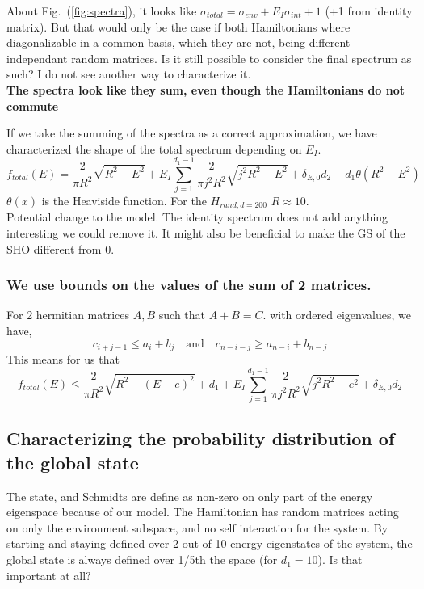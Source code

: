 \documentclass{article}
\begin{document}
About Fig.~(\ref{fig:spectra}), it looks like $\sigma_{total}=\sigma_{env}+E_I\sigma_{int} + 1$ (+1 from identity matrix). But that would only be the case if both Hamiltonians where diagonalizable in a common basis, which they are not, being different independant random matrices. Is it still possible to consider the final spectrum as such? I do not see another way to characterize it.\\

{\color{teal} \textbf{The spectra look like they sum, even though the Hamiltonians do not commute}}

If we take the summing of the spectra as a correct approximation, we have characterized the shape of the total spectrum depending on $E_I$. 
\begin{equation}
    f_{total}(E) = \frac{2}{\pi R^2}\sqrt{R^2-E^2} + E_I\sum_{j=1}^{d_1-1}\frac{2}{\pi j^2R^2}\sqrt{j^2R^2-E^2} + \delta_{E,0}d_2 + d_1\theta(R^2-E^2)
\end{equation}
$\theta(x)$ is the Heaviside function. For the $H_{rand, d=200}$ $R\approx 10$.\\

Potential change to the model. The identity spectrum does not add anything interesting we could remove it. It might also be beneficial to make the GS of the SHO different from 0. 

\subsubsection{We use bounds on the values of the sum of 2 matrices.}

For 2 hermitian matrices $A,B$ such that $A+B=C$. with ordered eigenvalues, we have,
\begin{equation}
    c_{i+j-1}\leq a_i+b_j\quad\text{and}\quad c_{n-i-j}\geq a_{n-i}+b_{n-j}
\end{equation}
This means for us that
\begin{equation}
    f_{total}(E)\leq \frac{2}{\pi R^2}\sqrt{R^2-(E-e)^2} + d_1 + E_I\sum^{d_1-1}_{j=1}\frac{2}{\pi j^2 R^2}\sqrt{j^2R^2-e^2} +\delta_{E,0}d_2
\end{equation}


\subsection{Characterizing the probability distribution of the global state}

The state, and Schmidts are define as non-zero on only part of the energy eigenspace because of our model. The Hamiltonian has random matrices acting on only the environment subspace, and no self interaction for the system. By starting and staying defined over 2 out of 10 energy eigenstates of the system, the global state is always defined over 1/5th the space (for $d_1=10$). Is that important at all? \\
\end{document}
